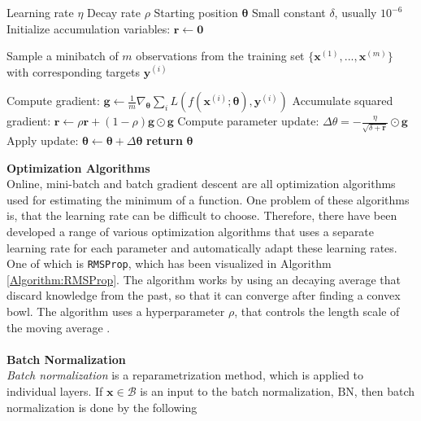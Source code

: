 \documentclass[./main.tex]{subfiles}
\begin{document}
\begin{algorithm}[h]
    \caption{$\mathbf{RMSProp}$ \cite{DeepLearning}}
    \label{Algorithm:RMSProp}
    \begin{algorithmic}[1]
        \Require Learning rate $\eta$
        \Require Decay rate $\rho$
        \Require Starting position $\bm{\theta}$
        \Require Small constant $\delta$, usually $10^{-6}$
        \State Initialize accumulation variables: $\bm{r} \gets \bm{0}$
            \State \begin{varwidth}[t]{\linewidth}
            Sample a minibatch of $m$ observations from the training set $\{\bm{x}^{(1)}, ..., \bm{x}^{(m)}\}$ with corresponding targets $\bm{y}^{(i)}$
            \end{varwidth}
            \State Compute gradient: $\bm{g} \gets \frac{1}{m} \nabla_{\bm{\theta}} \sum_i L(f(\bm{x}^{(i)}; \bm{\theta}), \bm{y}^{(i)})$
            \State Accumulate squared gradient: $\bm{r} \gets \rho \bm{r} + (1 - \rho) \bm{g} \odot \bm{g}$
            \State Compute parameter update: $\Delta\theta = - \frac{\eta}{\sqrt{\delta + \bm{r}}} \odot \bm{g}$
            \State Apply update: $\bm{\theta} \gets \bm{\theta} + \Delta \bm{\theta}$ 
        \EndWhile
        \State \textbf{return} $\bm{\theta}$
    \end{algorithmic}
\end{algorithm}
\noindent \textbf{Optimization Algorithms} \\
\noindent Online, mini-batch and batch gradient descent are all optimization algorithms used for estimating the minimum of a function. One problem of these algorithms is, that the learning rate can be difficult to choose. Therefore, there have been developed a range of various optimization algorithms that uses a separate learning rate for each parameter and automatically adapt these learning rates. One of which is \texttt{RMSProp}, which has been visualized in Algorithm \ref{Algorithm:RMSProp}. The algorithm works by using an decaying average that discard knowledge from the past, so that it can converge after finding a convex bowl. The algorithm uses a hyperparameter $\rho$, that controls the length scale of the moving average \cite{DeepLearning}.
\\
\\
\textbf{Batch Normalization} \\
\textit{Batch normalization} is a reparametrization method, which is applied to individual layers. If $\bm{x} \in \mathcal{B}$ is an input to the batch normalization, $\text{BN}$, then batch normalization is done by the following
\end{document}
